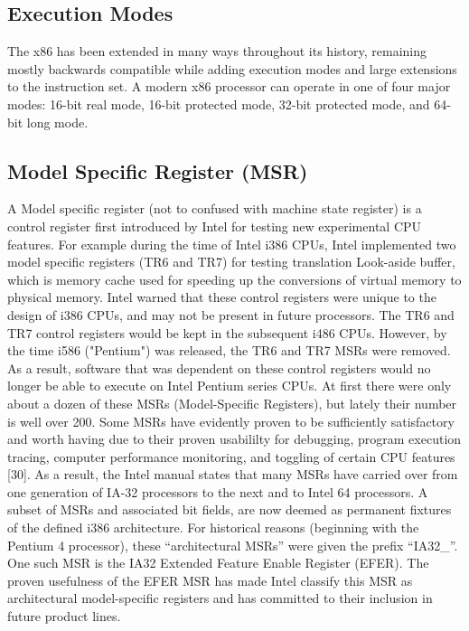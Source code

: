 \documentclass{report}
\begin{document}
\begin{spacing}{1.5}
\subsection{Execution Modes}

{\large
The x86 has been extended in many ways throughout its history, remaining mostly backwards compatible while adding execution modes and large extensions to the instruction set. A modern x86 processor can operate in one of four major modes: 16-bit real mode, 16-bit protected mode, 32-bit protected mode, and 64-bit long mode.
\newline
}



\subsection{Model Specific Register (MSR)}

{\large
A Model specific register (not to confused with machine state register) is a control register first introduced by Intel for testing new experimental CPU features. For example during the time of Intel i386 CPUs, Intel implemented two model specific registers (TR6 and TR7) for testing translation Look-aside buffer, which is memory cache used for speeding up the conversions of virtual memory to physical memory. Intel warned that these control registers were unique to the design of i386 CPUs, and may not be present in future processors. The TR6 and TR7 control registers would be kept in the subsequent i486 CPUs. However, by the time i586 ("Pentium") was released, the TR6 and TR7 MSRs were removed. As a result, software that was dependent on these control registers would no longer be able to execute on Intel Pentium series CPUs. At first there were only about a dozen of these MSRs (Model-Specific Registers), but lately their number is well over 200. Some MSRs have evidently proven to be sufficiently satisfactory and worth having due to their proven usabililty for debugging, program execution tracing, computer performance monitoring, and toggling of certain CPU features [30]. As a result, the Intel manual states that many MSRs have carried over from one generation of IA-32 processors to the next and to Intel 64 processors. A subset of MSRs and associated bit fields, are now deemed as permanent fixtures of the defined i386 architecture. For historical reasons (beginning with the Pentium 4 processor), these “architectural MSRs” were given the prefix “IA32\_”. One such MSR is the IA32 Extended Feature Enable Register (EFER). The proven usefulness of the EFER MSR has made Intel classify this MSR as architectural model-specific registers and has committed to their inclusion in future product lines.
\newline
}


\end{spacing}
\end{document}
